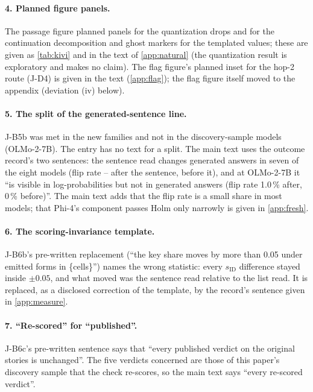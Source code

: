 \paragraph{4. Planned figure panels.} The passage figure planned panels for the quantization drops and for the continuation decomposition and ghost markers for the templated values; these are given as \cref{tab:kivi} and in the text of \cref{app:natural} (the quantization result is exploratory and makes no claim). The flag figure's planned inset for the hop-2 route (J-D4) is given in the text (\cref{app:flag}); the flag figure itself moved to the appendix (deviation (iv) below).

\paragraph{5. The split of the generated-sentence line.} J-B5b was met in the new families and not in the discovery-sample models (OLMo-2-7B). The entry has no text for a split. The main text uses the outcome record's two sentences: the sentence read changes generated answers in seven of the eight models (flip rate \JbFivebFlipPostMetMin{}--\JbFivebFlipPostMetMax{} after the sentence, \JbRangeFlipPreEightMax{} before it), and at OLMo-2-7B it ``is visible in log-probabilities but not in generated answers (flip rate 1.0\,\% after, 0\,\% before)''. The main text adds that the flip rate is a small share in most models; that Phi-4's component passes Holm only narrowly is given in \cref{app:fresh}. %

\paragraph{6. The scoring-invariance template.} J-B6b's pre-written replacement (``the key share moves by more than 0.05 under emitted forms in \{cells\}'') names the wrong statistic: every $s_{\mathrm{ID}}$ difference stayed inside $\pm 0.05$, and what moved was the sentence read relative to the list read. It is replaced, as a disclosed correction of the template, by the record's sentence given in \cref{app:measure}. %

\paragraph{7. ``Re-scored'' for ``published''.} J-B6c's pre-written sentence says that ``every published verdict on the original stories is unchanged''. The five verdicts concerned are those of this paper's discovery sample that the check re-scores, so the main text says ``every re-scored verdict''.

